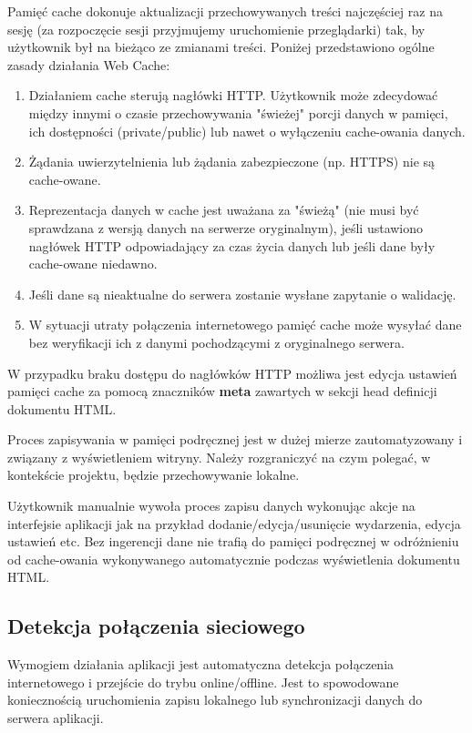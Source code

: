 Pamięć cache dokonuje aktualizacji przechowywanych treści najczęściej raz na sesję (za rozpoczęcie sesji przyjmujemy uruchomienie przeglądarki) tak, by użytkownik był na bieżąco ze zmianami treści. Poniżej przedstawiono ogólne zasady działania Web Cache\cite{cache}:

\begin{enumerate}
\item Działaniem cache sterują nagłówki HTTP. Użytkownik może zdecydować między innymi o czasie przechowywania "świeżej" porcji danych w pamięci, ich dostępności (private/public) lub nawet o wyłączeniu cache-owania danych.
\item Żądania uwierzytelnienia lub żądania zabezpieczone (np. HTTPS\cite{https}) nie są cache-owane.
\item Reprezentacja danych w cache jest uważana za "świeżą" (nie musi być sprawdzana z wersją danych na serwerze oryginalnym), jeśli ustawiono nagłówek HTTP odpowiadający za czas życia danych lub jeśli dane były cache-owane niedawno.
\item Jeśli dane są nieaktualne do serwera zostanie wysłane zapytanie o walidację.
\item W sytuacji utraty połączenia internetowego pamięć cache może wysyłać dane bez weryfikacji ich z danymi pochodzącymi z oryginalnego serwera.
\end{enumerate}

W przypadku braku dostępu do nagłówków HTTP możliwa jest edycja ustawień pamięci cache za pomocą znaczników \textbf{meta} zawartych w sekcji head definicji dokumentu HTML.

Proces zapisywania w pamięci podręcznej jest w dużej mierze zautomatyzowany i związany z wyświetleniem witryny. Należy rozgraniczyć na czym polegać, w kontekście projektu, będzie przechowywanie lokalne.

Użytkownik manualnie wywoła proces zapisu danych wykonując akcje na interfejsie aplikacji jak na przykład dodanie/edycja/usunięcie wydarzenia, edycja ustawień etc. Bez ingerencji dane nie trafią do pamięci podręcznej w odróżnieniu od cache-owania wykonywanego automatycznie podczas wyświetlenia dokumentu HTML.

\subsection{Detekcja połączenia sieciowego}
\label{sec:detPolSieciowego}

Wymogiem działania aplikacji jest automatyczna detekcja połączenia internetowego i przejście do trybu online/offline. Jest to spowodowane koniecznością uruchomienia zapisu lokalnego lub synchronizacji danych do serwera aplikacji.

